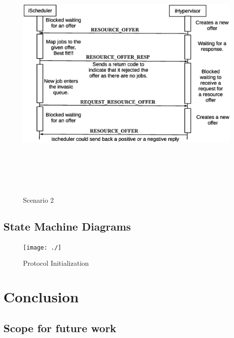 \documentclass[a4paper, 12pt]{article}
\begin{document}
\clearpage
\begin{figure}[h]
\centering
\includegraphics[width=1.0\textwidth, height=130mm]{./figures2.eps}
\caption{Scenario 2}
\label{fig:Seq2}
\end{figure}
\clearpage
\subsection{State Machine Diagrams}
\begin{figure}[h]
\centering
\texttt{[image: ./]}
\caption{Protocol Initialization}
\label{fig:Seq2}
\end{figure}
\section{Conclusion}
\subsection{Scope for future work}
\nocite{fontaine,gao,poorzahedy2,tianze,leblanc,kuo,poorzahedy1,wen}



\end{document}

